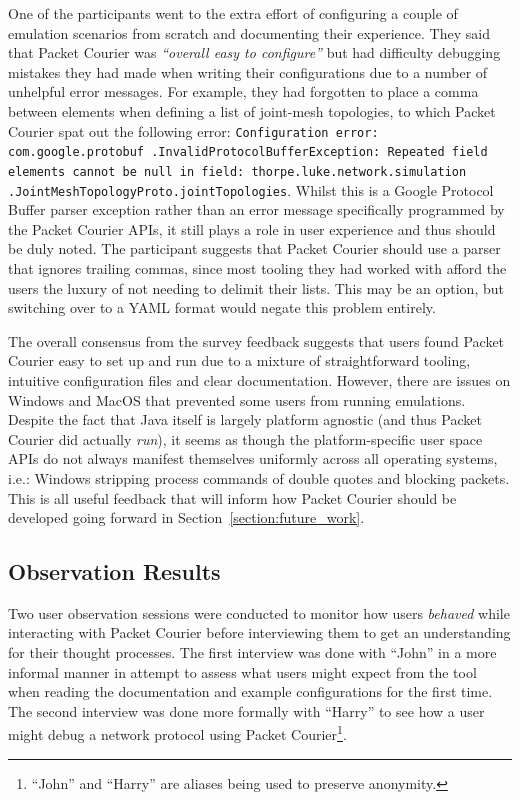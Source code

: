 One of the participants went to the extra effort of configuring a couple of emulation scenarios from scratch and
documenting their experience. They said that Packet Courier was \emph{``overall easy to configure''} but had
difficulty debugging mistakes they had made when writing their configurations due to a number of unhelpful error
messages. For example, they had forgotten to place a comma between elements when defining a list of joint-mesh
topologies, to which Packet Courier spat out the following error: \texttt{Configuration error: com.google.protobuf
.InvalidProtocolBufferException: Repeated field elements cannot be null in field: thorpe.luke.network.simulation
.JointMeshTopologyProto.jointTopologies}. Whilst this is a Google Protocol Buffer parser exception rather than an
error message specifically programmed by the Packet Courier APIs, it still plays a role in user experience and thus
should be duly noted. The participant suggests that Packet Courier should use a parser that ignores trailing commas,
since most tooling they had worked with afford the users the luxury of not needing to delimit their lists. This may
be an option, but switching over to a YAML format would negate this problem entirely.

The overall consensus from the survey feedback suggests that users found Packet Courier easy to set up and run due to
a mixture of straightforward tooling, intuitive configuration files and clear documentation. However, there are
issues on Windows and MacOS that prevented some users from running emulations. Despite the fact that Java itself is
largely platform agnostic (and thus Packet Courier did actually \emph{run}), it seems as though the platform-specific
user space APIs do not always manifest themselves uniformly across all operating systems, i.e.: Windows stripping
process commands of double quotes and blocking packets. This is all useful feedback that will inform how Packet
Courier should be developed going forward in Section~\ref{section:future_work}.

\subsection{Observation Results}\label{subsection:observation_results}

Two user observation sessions were conducted to monitor how users \emph{behaved} while interacting with Packet Courier
before interviewing them to get an understanding for their thought processes\cite{user_observation}. The first
interview was done with ``John'' in a more informal manner in attempt to assess what users might expect from the tool
when reading the documentation and example configurations for the first time. The second interview was done more
formally with ``Harry'' to see how a user might debug a network protocol using Packet Courier\footnote{``John'' and
``Harry'' are aliases being used to preserve anonymity.}.

